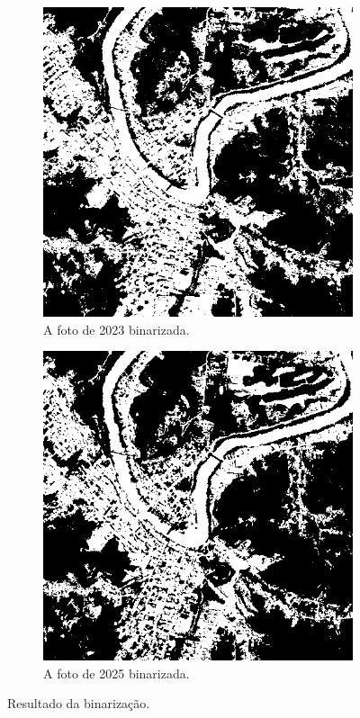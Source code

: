 \documentclass{article}
\begin{document}
\begin{figure}[H]
    \centering
    \begin{subfigure}[b]{0.48\textwidth}
        \includegraphics[width=\textwidth]{../Imagens/012023_bin.png}
        \caption{A foto de 2023 binarizada.}
        \label{2023}
    \end{subfigure}
    \hfill %
    \begin{subfigure}[b]{0.48\textwidth}
        \includegraphics[width=\textwidth]{../Imagens/012025_bin.png}
        \caption{A foto de 2025 binarizada.}
        \label{2025}
    \end{subfigure}
    \caption{Resultado da binarização.}
    \label{binarizada}
\end{figure}
\end{document}
